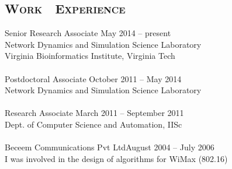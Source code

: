 \documentclass[margin,10pt]{res} %
\begin{document}
\begin{resume}
\section{\textnormal{\textsc{Work\,\,\,\, Experience}}} 
Senior Research Associate \hfill May 2014 -- present\\
Network Dynamics and Simulation Science Laboratory\\
Virginia Bioinformatics Institute, Virginia Tech\\
~~~\\
Postdoctoral Associate \hfill October 2011 -- May 2014\\
Network Dynamics and Simulation Science Laboratory\\
~~~\\
Research Associate \hfill March 2011 -- September 2011\\
Dept. of Computer Science and Automation, IISc \\
~~~\\
{Beceem Communications Pvt Ltd}\hfill August 2004 -- July 2006\\
I was involved in the design of algorithms for WiMax (802.16) \\

\end{resume}
\end{document}
